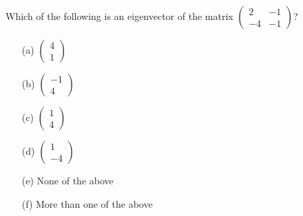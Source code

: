 \begin{problem}
    Which of the following is an eigenvector of the matrix \( \left( \begin{array}{cc} 2 &
        -1 \\ -4 & -1 \end{array} \right) \)?
\begin{enumerate}
    \item[(a)] \( \left( \begin{array}{c} 4 \\ 1 \end{array} \right) \)
    \item[(b)] \( \left( \begin{array}{c} -1 \\ 4 \end{array} \right) \)
    \item[(c)] \( \left( \begin{array}{c} 1 \\ 4 \end{array} \right) \)
    \item[(d)] \( \left( \begin{array}{c} 1 \\ -4 \end{array} \right) \)
    \item[(e)] None of the above
    \item[(f)] More than one of the above
\end{enumerate}
\end{problem}
%             

